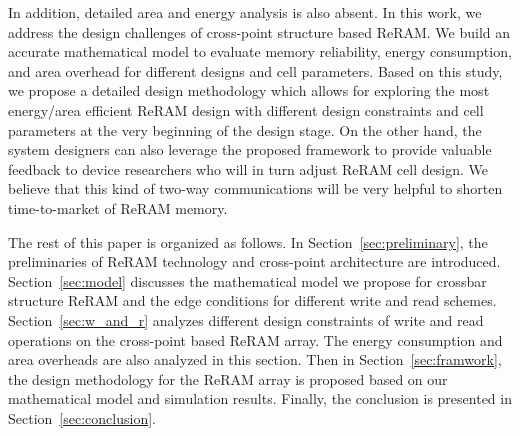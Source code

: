 In addition, detailed area and energy analysis is also absent.
In this work, we address the design challenges of cross-point structure based ReRAM. We build an accurate mathematical model to evaluate memory reliability, energy consumption, and area overhead for different designs and cell parameters. Based on this study, we propose a detailed design methodology which allows for exploring the most energy/area efficient ReRAM design with different design constraints and cell parameters at the very beginning of the design stage. On the other hand, the system designers can also leverage the proposed framework to provide valuable feedback to device researchers who will in turn adjust ReRAM cell design. We believe that this kind of two-way communications will be very helpful to shorten time-to-market of ReRAM memory.

The rest of this paper is organized as follows. In
Section~\ref{sec:preliminary}, the preliminaries of ReRAM technology and cross-point architecture are introduced. Section~\ref{sec:model} discusses the mathematical model we propose for crossbar structure ReRAM and the edge conditions for different write and read schemes. Section~\ref{sec:w_and_r} analyzes different design constraints of write and read operations on the cross-point based ReRAM array. The energy consumption and area overheads are also analyzed in this section. Then in Section~\ref{sec:framwork}, the design methodology for the ReRAM array is proposed based on our mathematical model and simulation results. Finally, the conclusion is presented in Section~\ref{sec:conclusion}.
